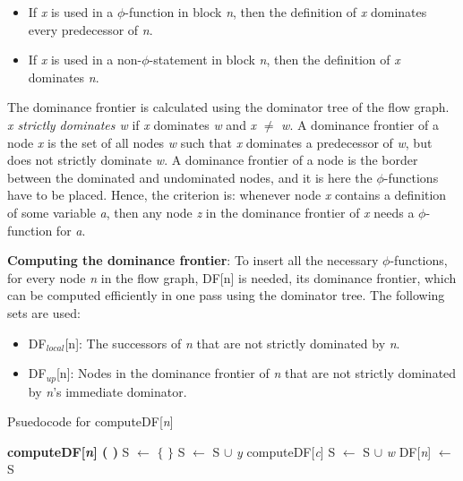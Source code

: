 \documentclass[10pt, oneside, a4paper]{article}
\begin{document}
\begin{itemize}
\item If \emph{x} is used in a $\phi$-function in block \emph{n}, then the definition of \emph{x} dominates every predecessor of \emph{n}.
\item If \emph{x} is used in a non-$\phi$-statement in block \emph{n}, then the definition of \emph{x} dominates \emph{n}.
\end{itemize}

The dominance frontier is calculated using the dominator tree of the flow graph.  \emph{x strictly dominates w} if \emph{x} dominates \emph{w} and \emph{x} $\neq$ \emph{w}.  A dominance frontier of a node \emph{x} is the set of all nodes \emph{w} such that \emph{x} dominates a predecessor of \emph{w}, but does not strictly dominate \emph{w}.  A dominance frontier of a node is the border between the dominated and undominated nodes, and it is here the $\phi$-functions have to be placed.  Hence, the criterion is: whenever node \emph{x} contains a definition of some variable \emph{a}, then any node \emph{z} in the dominance frontier of \emph{x} needs a $\phi$-function for \emph{a}.

\textbf{Computing the dominance frontier}:  To insert all the necessary $\phi$-functions, for every node \emph{n} in the flow graph, DF[n] is needed, its dominance frontier, which can be computed efficiently in one pass using the dominator tree.  The following sets are used:

\begin{itemize}
\item DF$_{local}$[n]:  The successors of \emph{n} that are not strictly dominated by \emph{n}.
\item DF$_{up}$[n]:  Nodes in the dominance frontier of \emph{n} that are not strictly dominated by \emph{n}'s immediate dominator.
\end{itemize}

\begin{algorithm}
\caption{Psuedocode for computeDF[\emph{n}]}
\label{alg1}
\begin{algorithmic}[1]
\STATE \textbf{computeDF[\emph{n}] ( )}
\STATE S $\leftarrow$ $\{$ $\}$
\STATE S $\leftarrow$ S $\cup$ {\emph{y}}
\ENDIF
\ENDFOR
{}
\STATE computeDF[\emph{c}]
\STATE S $\leftarrow$ S $\cup$ {\emph{w}}
\ENDIF
\ENDFOR
\ENDFOR
\STATE DF[\emph{n}] $\leftarrow$ S
\end{algorithmic}
\end{algorithm}
\end{document}
